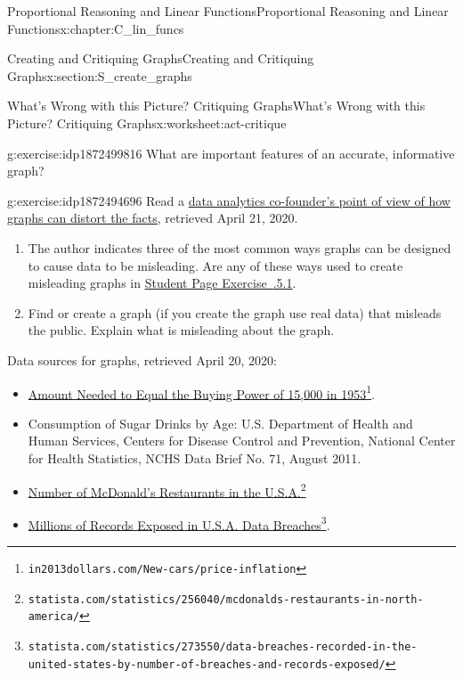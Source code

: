\documentclass[oneside,10pt,]{book}
\newcommand{\xreffont}{\relax}
\numberwithin{equation}{chapter}
\begin{document}
\begin{chapterptx}{Proportional Reasoning and Linear Functions}{}{Proportional Reasoning and Linear Functions}{}{}{x:chapter:C_lin_funcs}
\begin{sectionptx}{Creating and Critiquing Graphs}{}{Creating and Critiquing Graphs}{}{}{x:section:S_create_graphs}
\begin{worksheet-subsection}{What's Wrong with this Picture? Critiquing Graphs}{}{What's Wrong with this Picture? Critiquing Graphs}{}{}{x:worksheet:act-critique}
\begin{divisionexercise}{3}{}{}{g:exercise:idp1872499816}%
What are important features of an accurate, informative graph?%
\end{divisionexercise}%
\begin{divisionexercise}{4}{}{}{g:exercise:idp1872494696}%
Read a \href{http://www.huffingtonpost.com/raviparikh/lie-with-data-visualization_b_5169715.html}{data analytics co-founder's point of view of how graphs can distort the facts}\footnotemark{}, retrieved April 21, 2020.%
\begin{enumerate}[font=\bfseries,label=(\alph*),ref=\alph*]
\item{}The author indicates three of the most common ways graphs can be designed to cause data to be misleading. Are any of these ways used to create misleading graphs in \hyperlink{x:exercise:exer-critique-1}{Student Page Exercise~{\xreffont 2.2.5.1}}.%
\item{}Find or create a graph (if you create the graph use real data) that misleads the public. Explain what is misleading about the graph.%
\end{enumerate}
\end{divisionexercise}%
%
\begin{conclusion}{}%
Data sources for graphs, retrieved April 20, 2020:%
\begin{itemize}[label=\textbullet]
\item{}\href{https://www.in2013dollars.com/New-cars/price-inflation}{Amount Needed to Equal the Buying Power of \textdollar{}15,000 in 1953}\footnote{\nolinkurl{in2013dollars.com/New-cars/price-inflation}\label{g:fn:idp1872498024}}.%
\item{}Consumption of Sugar Drinks by Age: U.S. Department of Health and Human Services, Centers for Disease Control and Prevention, National Center for Health Statistics, NCHS Data Brief No. 71, August 2011.%
\item{}\href{https://www.statista.com/statistics/256040/mcdonalds-restaurants-in-north-america/}{Number of McDonald's Restaurants in the U.S.A.}\footnote{\nolinkurl{statista.com/statistics/256040/mcdonalds-restaurants-in-north-america/}\label{g:fn:idp1872495976}}%
\item{}\href{https://www.statista.com/statistics/273550/data-breaches-recorded-in-the-united-states-by-number-of-breaches-and-records-exposed/}{Millions of Records Exposed in U.S.A. Data Breaches}\footnote{\nolinkurl{statista.com/statistics/273550/data-breaches-recorded-in-the-united-states-by-number-of-breaches-and-records-exposed/}\label{g:fn:idp1872498536}}.%

\end{itemize}
\end{conclusion}
\end{worksheet-subsection}
\end{sectionptx}
\end{chapterptx}
\end{document}
